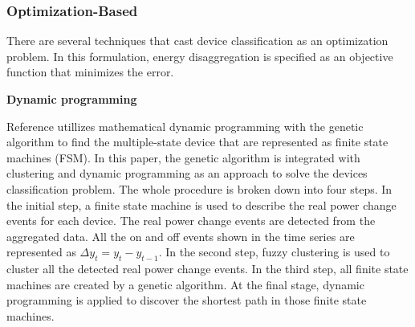 \subsubsection{Optimization-Based}
There are several techniques that cast device classification as an optimization problem. In this formulation, energy disaggregation is specified as an objective function that minimizes the error.



\textbf{Dynamic programming}

Reference \cite{baranski2004detecting} utillizes mathematical dynamic programming
with the genetic algorithm to find the multiple-state device that are represented as finite state machines (FSM).
In this paper, 
the genetic algorithm is integrated with clustering and 
dynamic programming as an approach to solve the devices classification 
problem.%
The whole procedure is broken down into four steps. 
In the initial step, a finite state machine is used to describe the real power change events for each device.
The real power change events are detected from the aggregated data. 
All the on and off events shown in the time series 
are represented as $\Delta y_t =y_t - y_{t-1}$.
In the second step, fuzzy clustering is used to cluster all the 
detected real power change events. 
In the third step, all finite state machines are 
created by a genetic algorithm. 
At the final stage, dynamic programming is applied to 
discover the shortest path in those finite state machines. 

